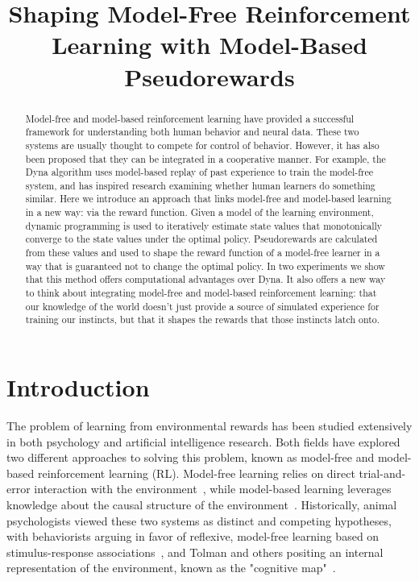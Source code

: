 \documentclass[letterpaper]{article}
\begin{document}
%

\title{Shaping Model-Free Reinforcement Learning with Model-Based Pseudorewards}
\date{}
\maketitle
\begin{abstract}
Model-free and model-based reinforcement learning have provided a successful framework for understanding both human behavior and neural data. These two systems are usually thought to compete for control of behavior. However, it has also been proposed that they can be integrated in a cooperative manner. For example, the Dyna algorithm uses model-based replay of past experience to train the model-free system, and has inspired research examining whether human learners do something similar. Here we introduce an approach that links model-free and model-based learning in a new way: via the reward function. Given a model of the learning environment, dynamic programming is used to iteratively estimate state values that monotonically converge to the state values under the optimal policy. Pseudorewards are calculated from these values and used to shape the reward function of a model-free learner in a way that is guaranteed not to change the optimal policy. In two experiments we show that this method offers computational advantages over Dyna. It also offers a new way to think about integrating model-free and model-based reinforcement learning: that our knowledge of the world doesn't just provide a source of simulated experience for training our instincts, but that it shapes the rewards that those instincts latch onto.
\end{abstract}

\section{Introduction}

The problem of learning from environmental rewards has been studied extensively in both psychology and artificial intelligence research. Both fields have explored two different approaches to solving this problem, known as model-free and model-based reinforcement learning (RL). Model-free learning relies on direct trial-and-error interaction with the environment~\cite{sutton1992reinforcement}, while model-based learning leverages knowledge about the causal structure of the environment~\cite{barto1995learning}. Historically, animal psychologists viewed these two systems as distinct and competing hypotheses, with behaviorists arguing in favor of reflexive, model-free learning based on stimulus-response associations~\cite{thorndike1933proof}, and Tolman and others positing an internal representation of the environment, known as the "cognitive map"~\cite{tolman1948cognitive}.
\end{document}
